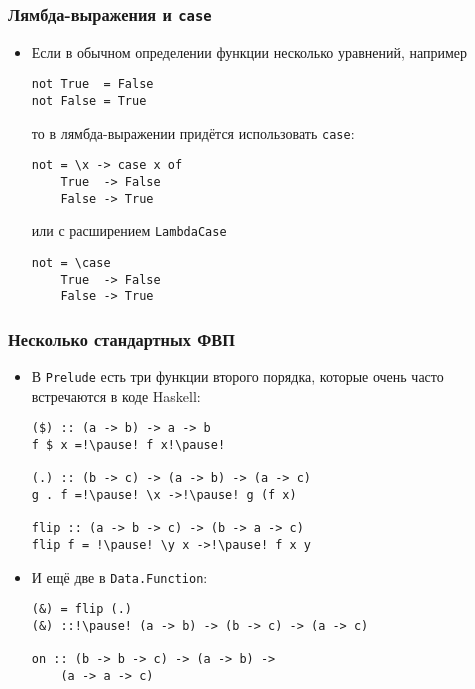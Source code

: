 \documentclass[10pt]{beamer}
\begin{document}
\begin{frame}[fragile]
\frametitle{Лямбда-выражения и \lstinline|case|}
\begin{itemize}
    \item Если в обычном определении функции несколько уравнений, например
\begin{lstlisting}
not True  = False
not False = True
\end{lstlisting}
    то в лямбда-выражении придётся использовать \lstinline|case|:\pause
\begin{lstlisting}
not = \x -> case x of
    True  -> False
    False -> True
\end{lstlisting}\pause
    или с расширением \lstinline|LambdaCase|
\begin{lstlisting}
not = \case
    True  -> False
    False -> True
\end{lstlisting}
\end{itemize}
\end{frame}

\begin{frame}[fragile]
\frametitle{Несколько стандартных ФВП}
\begin{itemize}
    \item В \lstinline|Prelude| есть три функции второго порядка, которые очень часто встречаются в коде Haskell:
\begin{lstlisting}
($) :: (a -> b) -> a -> b
f $ x =!\pause! f x!\pause!

(.) :: (b -> c) -> (a -> b) -> (a -> c)
g . f =!\pause! \x ->!\pause! g (f x)

flip :: (a -> b -> c) -> (b -> a -> c)
flip f = !\pause! \y x ->!\pause! f x y
\end{lstlisting}
    \item И ещё две в \lstinline|Data.Function|:
\begin{lstlisting}
(&) = flip (.)
(&) ::!\pause! (a -> b) -> (b -> c) -> (a -> c)

on :: (b -> b -> c) -> (a -> b) -> 
    (a -> a -> c)
\end{lstlisting}
\end{itemize}
\end{frame}
\end{document}
